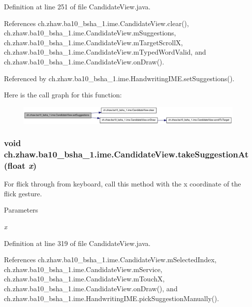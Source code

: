 Definition at line 251 of file CandidateView.java.

References ch.zhaw.ba10\_\-bsha\_\-1.ime.CandidateView.clear(), ch.zhaw.ba10\_\-bsha\_\-1.ime.CandidateView.mSuggestions, ch.zhaw.ba10\_\-bsha\_\-1.ime.CandidateView.mTargetScrollX, ch.zhaw.ba10\_\-bsha\_\-1.ime.CandidateView.mTypedWordValid, and ch.zhaw.ba10\_\-bsha\_\-1.ime.CandidateView.onDraw().

Referenced by ch.zhaw.ba10\_\-bsha\_\-1.ime.HandwritingIME.setSuggestions().

Here is the call graph for this function:\nopagebreak
\begin{figure}[H]
\begin{center}
\leavevmode
\includegraphics[width=420pt]{classch_1_1zhaw_1_1ba10__bsha__1_1_1ime_1_1CandidateView_a3b2b7c5d303e3e6c25dd7458d61b2a20_cgraph}
\end{center}
\end{figure}
\hypertarget{classch_1_1zhaw_1_1ba10__bsha__1_1_1ime_1_1CandidateView_af87d8229ab4a607f3a0e60dcfb435562}{
\subsubsection[{takeSuggestionAt}]{\setlength{\rightskip}{0pt plus 5cm}void ch.zhaw.ba10\_\-bsha\_\-1.ime.CandidateView.takeSuggestionAt (float {\em x})}}
\label{classch_1_1zhaw_1_1ba10__bsha__1_1_1ime_1_1CandidateView_af87d8229ab4a607f3a0e60dcfb435562}
For flick through from keyboard, call this method with the x coordinate of the flick gesture. 
\begin{DoxyParams}{Parameters}
\item[{\em x}]\end{DoxyParams}


Definition at line 319 of file CandidateView.java.

References ch.zhaw.ba10\_\-bsha\_\-1.ime.CandidateView.mSelectedIndex, ch.zhaw.ba10\_\-bsha\_\-1.ime.CandidateView.mService, ch.zhaw.ba10\_\-bsha\_\-1.ime.CandidateView.mTouchX, ch.zhaw.ba10\_\-bsha\_\-1.ime.CandidateView.onDraw(), and ch.zhaw.ba10\_\-bsha\_\-1.ime.HandwritingIME.pickSuggestionManually().

